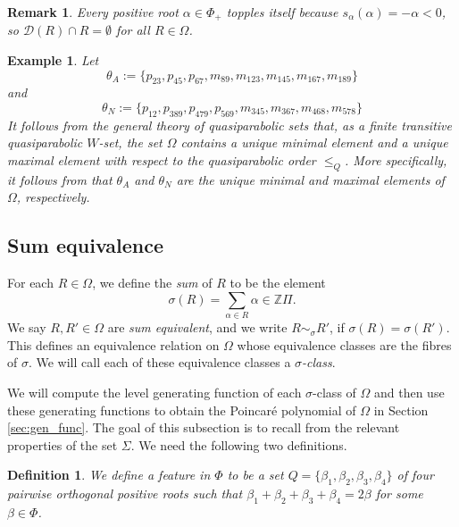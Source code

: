 \documentclass[10pt,a4paper]{amsart}
\newtheorem{defn}[theorem]{Definition}
\newtheorem{exa}[theorem]{Example}
\newtheorem{rmk}[theorem]{Remark}
\numberwithin{equation}{section}
\newcommand{\al}{\alpha}
\newcommand{\be}{\beta}
\newcommand{\Z}{{\mathbb Z}}
\newcommand{\res}{\mathscr{D}}
\newcommand{\ob}{\Omega}
\begin{document}
\begin{rmk}
\label{rmk:self_topple}
Every positive root $\al\in \Phi_+$ topples itself because $s_\al(\al)=-\al<0$,
so $\res(R)\cap R=\emptyset$ for all $R\in \ob$. 
\end{rmk}


\begin{exa}
  \label{exa:minmax} 
Let 
\begin{equation*}
\label{eq:theta_A}
\theta_A:=\{p_{23}, p_{45}, p_{67}, m_{89}, m_{123}, m_{145}, m_{167}, m_{189}\}
\end{equation*}
and
\begin{equation*}
\label{eq:theta_N}
\theta_N:=\{p_{12}, p_{389}, p_{479}, p_{569}, m_{345}, m_{367}, m_{468}, m_{578}\} 
\end{equation*}
It follows from the general theory of quasiparabolic sets that, as a finite
transitive quasiparabolic $W$-set, the set $\ob$ contains a unique minimal
element and a unique maximal element with respect to the quasiparabolic order
$\le_Q$. More specifically, it follows from \cite[Proposition 4.11, Proposition
6.9]{gx5} that $\theta_A$ and $\theta_N$ are the unique minimal and maximal
elements of $\ob$, respectively.  \end{exa}


\subsection{Sum equivalence}
\label{sec:sums}
For each $R\in \ob$, we define the \emph{sum} of $R$ to be the element
\[
\sigma(R)=\sum_{\al\in R}\al\in \Z\Pi.
\]
We say $R, R'\in \ob$ are \emph{sum equivalent}, and we write $R\sim_\sigma R'$,
if $\sigma(R)=\sigma(R')$. This defines an equivalence relation on $\ob$ whose
equivalence classes are the fibres of $\sigma$. We will call each of these
equivalence classes a \emph{$\sigma$-class}.

We will compute the level generating function of each $\sigma$-class of $\ob$
and then use these generating functions to obtain the Poincar\'e polynomial of
$\ob$ in Section \ref{sec:gen_func}.  The goal of this subsection is to recall
from \cite{gx5} the relevant properties of the set $\Sigma$. We need the
following two definitions.


\begin{defn}
\label{defn:feature}
We define a \emph{feature} in $\Phi$ to be a set $Q=\{\be_1,\be_2,\be_3,\be_4\}$
of four pairwise orthogonal positive roots such that $\be_1+\be_2+\be_3+\be_4=2\be$ for
some $\be\in \Phi$. 
\end{defn}
\end{document}
